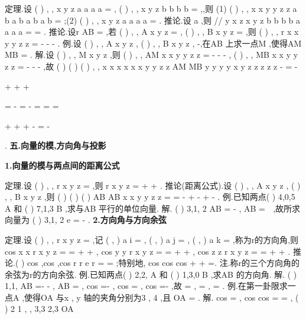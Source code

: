 \textcolor{lyred}{定理}.设
(
)
,
,
x
y
z
a
a a a
=
\rho 
,
(
)
,
,
x
y
z
b
b b b
=
\rho 
,\lambda \in {},则 
(1)
(
)
,
,
x
x
y
y
z
z
a
b
a
b a
b a
b
\pm 
=
\pm 
\pm 
\pm 
\rho 
\rho 
;(2)
(
)
,
,
x
y
z
a
a
a
a
\lambda 
\lambda 
\lambda 
\lambda 
=
\rho 
. 
\textcolor{lyred}{推论}.设
a \neq 
\rho 
\rho 
,则
//
y
x
z
x
y
z
b
b
b
b
a
a
a
a
\Leftrightarrow 
=
=
\rho 
\rho 
. 
\textcolor{lyred}{推论}.设r
AB
=
\xi \xi \xi \rho 
\rho 
,若
(
)
,
,
A
x y z
=
,
(
)
,
,
B
x
y
z
=
,则
(
)
,
,
r
x
x y
y z
z
=
-
-
-
\rho 
. 
\textcolor{lyred}{例}.设
(
)
,
,
A x y z
, (
)
,
,
B x
y
z
,
\lambda \neq -,在AB 上求一点M ,使得AM
MB
\lambda 
=
\xi \xi \xi \xi \rho 
\xi \xi \xi \rho 
. 
解.设
(
)
, ,
M x y z ,则
(
)
,
,
AM
x
x y
y z
z
=
-
-
-
\xi \xi \xi \xi \rho 
,
(
)
,
,
MB
x
x y
y z
z
=
-
-
-
\xi \xi \xi \rho 
,故 
(
)
(
)
(
)
,
,
x
x
x
x
x
x
y
y
z
z
AM
MB
y
y
y
y
x
y
z
z
z
z
z
\lambda 
\lambda 
\lambda 
\lambda 
\lambda 
\lambda 
\lambda 
\lambda 
\lambda 
\lambda 
-
=
-

+
+
+

=
\Rightarrow 
-
=
-
\Rightarrow 
=
=
=

+
+
+
-
=
-

\xi \xi \xi \xi \rho 
\xi \xi \xi \rho 
. 
\vspace{4pt}
{\bfseries \textcolor{lyred}{五.向量的模,方向角与投影}}

{\bfseries \textcolor{lyred}{1.向量的模与两点间的距离公式}}

\textcolor{lyred}{定理}.设
(
)
, ,
r
x y z
=
\rho 
,则
r
x
y
z
=
+
+
\rho 
. 
\textcolor{lyred}{推论(距离公式)}.设
(
)
,
,
A x y z
,
(
)
,
,
B x
y
z
,则 
(
)
(
)
(
)
AB
AB
x
x
y
y
z
z
=
=
-
+
-
+
-
\xi \xi \xi \rho 
. 
\textcolor{lyred}{例}.已知两点(
)
4,0,5
A
和
(
)
7,1,3
B
,求与AB
\xi \xi \xi \rho 
平行的单位向量. 
解.
(
)
3,1, 2
AB =
-
\xi \xi \xi \rho 
,
AB =
\xi \xi \xi 
,故所求向量为
(
)
3,1, 2
e =\pm 
-
\rho 
. 
{\bfseries \textcolor{lyred}{2.方向角与方向余弦}}

\textcolor{lyred}{定理}.设
(
)
, ,
r
x y z
=
\rho 
,记
\partial 
( , )
a i
\alpha =
\rho 
\rho 
,
\cdot 
( , )
a j
\beta =
\rho 
\rho 
,
\cdot 
( , )
a k
\gamma =
\rho 
\rho 
,称为r\rho 的\textcolor{lyred}{方向角},则 
cos
x
x
r
x
y
z
\alpha =
=
+
+
\rho 
,
cos
y
y
r
x
y
z
\beta =
=
+
+
\rho 
,
cos
z
z
r
x
y
z
\gamma =
=
+
+
\rho 
. 
\textcolor{lyred}{推论}.(
)
cos ,cos
,cos
r
r
e
r
\alpha 
\beta 
\gamma =
=
\rho 
\rho 
\rho 
;特别地,
cos
cos
cos
\alpha 
\beta 
\gamma 
+
+
=. 
\textcolor{lyred}{注}.称r\rho 的三个方向角的余弦为r\rho 的\textcolor{lyred}{方向余弦}. 
\textcolor{lyred}{例}.已知两点(
)
2,2,
A
和
(
)
1,3,0
B
,求AB
\xi \xi \xi \rho 
的方向角. 
解.
(
)
1,1,
AB =-
-
\xi \xi \xi \rho 
,
AB =
\xi \xi \xi \rho 
,
cos
\alpha =-
,
cos
\beta =
,
cos
\gamma =-
,故 
\pi 
\alpha =
,
\pi 
\beta =
,
\pi 
\gamma =
. 
\textcolor{lyred}{例}.在第一卦限求一点A ,使得OA
\xi \xi \xi \rho 
与x , y 轴的夹角分别为3
\pi , 4
\pi ,且
OA =
\xi \xi \xi \rho 
. 
解.
cos
\alpha =
,
cos
cos
\beta 
\gamma 
=
\Rightarrow 
=
,
(
)
2 1
,
,
3,3 2,3
OA



